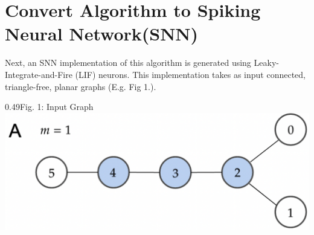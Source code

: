 \section{Convert Algorithm to Spiking Neural Network(SNN)}\label{subsec:algo_to_snn}
Next, an SNN implementation of this algorithm is generated using Leaky-Integrate-and-Fire (LIF) neurons. This implementation takes as input connected, triangle-free, planar graphs (E.g. Fig 1.). 
\hspace{-3em}
\begin{rudifig}{0.49\hsize}{Fig. 1: Input Graph}
    \hspace{-1.5em}
    \includegraphics[width=1.1\linewidth]{latex/Images/input_graph_G_6_0_alternative1.png}
    \label{fig:input_graph}
\end{rudifig}
